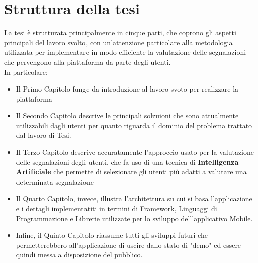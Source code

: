         \newpage

\section{Struttura della tesi}
        La tesi è strutturata principalmente in cinque parti, che coprono gli aspetti principali del lavoro svolto, con un'attenzione particolare alla metodologia utilizzata per implementare in modo efficiente la valutazione delle segnalazioni che pervengono alla piattaforma da parte degli utenti. \\
        In particolare:
        \begin{itemize}
            \item Il Primo Capitolo funge da introduzione al lavoro svoto per realizzare la piattaforma
            \item Il Secondo Capitolo descrive le principali solzuioni che sono attualmente utilizzabili dagli utenti per quanto riguarda il dominio del problema trattato dal lavoro di Tesi.
            \item Il Terzo Capitolo descrive accuratamente l'approccio usato per la valutazione delle segnalazioni degli utenti, che fa uso di una tecnica di \textbf{Intelligenza Artificiale} che permette di selezionare gli utenti più adatti a valutare una determinata segnalazione
            \item Il Quarto Capitolo, invece, illustra l'architettura su cui si basa l'applicazione e i dettagli implementatiti in termini di Framework, Linguaggi di Programmazione e Librerie utilizzate per lo sviluppo dell'applicativo Mobile.
            \item Infine, il Quinto Capitolo riassume tutti gli sviluppi futuri che permetterebbero all'applicazione di uscire dallo stato di "demo" ed essere quindi messa a disposizione del pubblico.
        \end{itemize}
